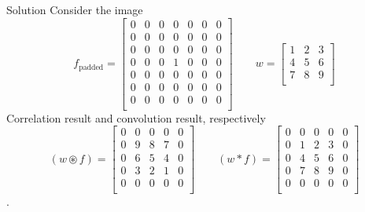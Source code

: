 \begin{frame}{Solution}%
    Consider the image
    \begin{equation*}
        f_\mathrm{padded} = \begin{bmatrix}
          0 & 0 & 0 & 0 & 0 & 0 & 0\\
          0 & 0 & 0 & 0 & 0 & 0 & 0\\
          0 & 0 & 0 & 0 & 0 & 0 & 0\\
          0 & 0 & 0 & 1 & 0 & 0 & 0\\
          0 & 0 & 0 & 0 & 0 & 0 & 0\\
          0 & 0 & 0 & 0 & 0 & 0 & 0\\
          0 & 0 & 0 & 0 & 0 & 0 & 0\\
        \end{bmatrix}
        \qquad
        w = \begin{bmatrix}
          1 & 2 & 3\\
          4 & 5 & 6\\
          7 & 8 & 9\\
        \end{bmatrix}
    \end{equation*}
    Correlation result and convolution result, respectively
    \begin{equation*}
        (w\circledast f) = \begin{bmatrix}
          0 & 0 & 0 & 0 & 0\\
          0 & 9 & 8 & 7 & 0\\
          0 & 6 & 5 & 4 & 0\\
          0 & 3 & 2 & 1 & 0\\
          0 & 0 & 0 & 0 & 0\\
        \end{bmatrix}\qquad
        (w\ast f) = \begin{bmatrix}
          0 & 0 & 0 & 0 & 0\\
          0 & 1 & 2 & 3 & 0\\
          0 & 4 & 5 & 6 & 0\\
          0 & 7 & 8 & 9 & 0\\
          0 & 0 & 0 & 0 & 0\\
        \end{bmatrix}
    \end{equation*}.
\end{frame}

